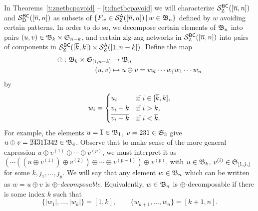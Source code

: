 \documentclass[11pt]{article}
\theoremstyle{definition}
\numberwithin{equation}{section}
\begin{document}
In Theorems~\ref{t:znetbcpavoid} -- \ref{t:dnetbcpavoid}
we will characterize
$\mathcal S^{\mathsf{BC}}_{\mathrm Z}([\overline{n},n])$ and $\mathcal S^{\mathsf{BC}}_{\mathrm D}([\overline{n},n])$
as subsets of $\{ F_w \in \mathcal S^{\mathsf{A}}_{\mathrm Z}([\overline{n},n]) \,|\, w \in \mathfrak{B}_n \}$
defined by $w$ avoiding certain patterns.
In order to do so, we
decompose certain
elements of $\mathfrak{B}_n$ into pairs $(u,v) \in \mathfrak{B}_{k} \times \mathfrak{S}_{n-k}$,
and certain
zig-zag networks in $\mathcal S^{\mathsf{BC}}_{\mathrm Z}([\overline{n},n])$
into pairs of components in $\mathcal S^{\mathsf{BC}}_{\mathrm Z}([\overline{k},k]) \times \mathcal S^{\mathsf{A}}_{\mathrm Z}([1,n-k])$.
Define the map
\begin{equation}\label{eq:oplusperm}
  \begin{aligned}
    \oplus: \mfb{k} \times \mfs{[1,n-k]} &\rightarrow \mfb{n}\\
    (u,v) &\mapsto u \oplus v = w_{\ol{n}} \cdots w_{\ol1} w_1 \cdots w_n
  \end{aligned}
\end{equation}
by 
\begin{equation*}
  w_i = \begin{cases}
    u_i &\text{if $i \in [\overline{k}, k]$},\\
    v_i + k &\text{if $i > k$},\\
    \overline{v_i + k} &\text{if $i < \overline{k}$}.
  \end{cases}
\end{equation*}
For example,
the elements
$u = \overline{1} \in \mathfrak{B}_{1}$, $v = 231 \in \mathfrak{S}_{3}$ give
$u \oplus v  =\overline{2}\overline{4}\overline{3} 1 \overline{1} 342 \in \mathfrak{B}_{4}$.
Observe that to make sense of the more general expression
$u \oplus v^{(1)} \oplus \cdots \oplus v^{(p)}$,
we must interpret it as
$( \cdots ((u \oplus v^{(1)}) \oplus v^{(2)}) \oplus \cdots \oplus v^{(p-1)}) \oplus v^{(p)}$, with $u \in \mathfrak{B}_{k}$, $v^{(i)} \in \mathfrak{S}_{[1,j_i]}$
for some $k, j_1, \dotsc, j_p$.
We will say that any element $w \in \mathfrak{B}_n$ which can be written as
$w = u \oplus v$ is {\em $\oplus$-decomposable}.
Equivalently, $w \in \mathfrak{B}_n$ is $\oplus$-decomposable if there is
some index $k$ such that
\begin{equation*}
  \{|w_1|, \dotsc, |w_k| \} = [1,k], \qquad \{w_{k+1}, \dotsc, w_n\} = [k+1,n].
\end{equation*}
\end{document}
